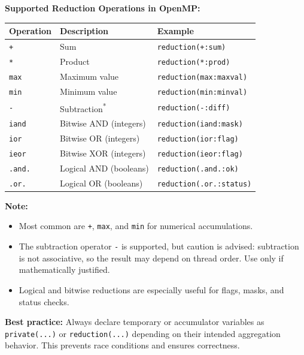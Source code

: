 \documentclass{article}
\begin{document}
\vspace{1em}
\noindent
\textbf{Supported Reduction Operations in OpenMP:}

\begin{center}
\begin{tabular}{|l|l|l|}
\hline
\textbf{Operation} & \textbf{Description} & \textbf{Example} \\
\hline
\texttt{+} & Sum & \texttt{reduction(+:sum)} \\
\texttt{*} & Product & \texttt{reduction(*:prod)} \\
\texttt{max} & Maximum value & \texttt{reduction(max:maxval)} \\
\texttt{min} & Minimum value & \texttt{reduction(min:minval)} \\
\texttt{-} & Subtraction\textsuperscript{*} & \texttt{reduction(-:diff)} \\
\hline
\texttt{iand} & Bitwise AND (integers) & \texttt{reduction(iand:mask)} \\
\texttt{ior} & Bitwise OR (integers) & \texttt{reduction(ior:flag)} \\
\texttt{ieor} & Bitwise XOR (integers) & \texttt{reduction(ieor:flag)} \\
\hline
\texttt{.and.} & Logical AND (booleans) & \texttt{reduction(.and.:ok)} \\
\texttt{.or.} & Logical OR (booleans) & \texttt{reduction(.or.:status)} \\
\hline
\end{tabular}
\end{center}

\vspace{1em}
\noindent
\textbf{Note:}
\begin{itemize}
\item Most common are \texttt{+}, \texttt{max}, and \texttt{min} for numerical accumulations.
\item The subtraction operator \texttt{-} is supported, but caution is advised: subtraction is not associative, so the result may depend on thread order. Use only if mathematically justified.
\item Logical and bitwise reductions are especially useful for flags, masks, and status checks.
\end{itemize}

\noindent
\textbf{Best practice:} Always declare temporary or accumulator variables as \texttt{private(...)} or \texttt{reduction(...)} depending on their intended aggregation behavior. This prevents race conditions and ensures correctness.
\end{document}
